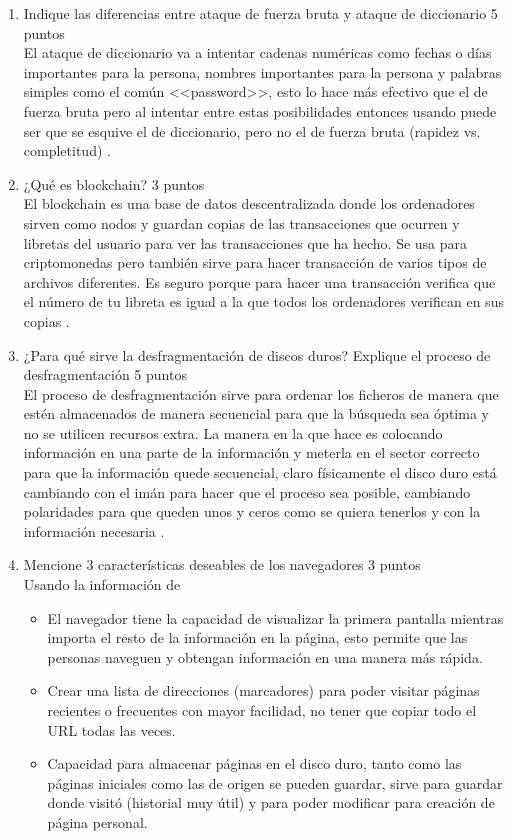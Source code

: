 \documentclass[stu, 12pt, letterpaper, donotrepeattitle, floatsintext, natbib, helv]{apa7}
\begin{document}
\begin{enumerate}
    \item Indique las diferencias entre ataque de fuerza bruta y ataque de diccionario 5 puntos \\
    El ataque de diccionario va a intentar cadenas numéricas como fechas o días importantes para la persona, nombres importantes para la persona y palabras simples como el común <<password>>, esto lo hace más efectivo que el de fuerza bruta pero al intentar entre estas posibilidades entonces usando puede ser que se esquive el de diccionario, pero no el de fuerza bruta (rapidez vs. completitud) .
    
    \item ¿Qué es blockchain? 3 puntos \\
    El blockchain es una base de datos descentralizada donde los ordenadores sirven como nodos y guardan copias de las transacciones que ocurren y libretas del usuario para ver las transacciones que ha hecho. Se usa para criptomonedas pero también sirve para hacer transacción de varios tipos de archivos diferentes. Es seguro porque para hacer una transacción verifica que el número de tu libreta es igual a la que todos los ordenadores verifican en sus copias .
    
    \item ¿Para qué sirve la desfragmentación de discos duros? Explique el proceso de desfragmentación 5 puntos \\
    El proceso de desfragmentación sirve para ordenar los ficheros de manera que estén almacenados de manera secuencial para que la búsqueda sea óptima y no se utilicen recursos extra. La manera en la que hace es colocando información en una parte de la información y meterla en el sector correcto para que la información quede secuencial, claro físicamente el disco duro está cambiando con el imán para hacer que el proceso sea posible, cambiando polaridades para que queden unos y ceros como se quiera tenerlos y con la información necesaria .

    \item Mencione 3 características deseables de los navegadores 3 puntos \\
    Usando la información de 
    \begin{itemize}
        \item El navegador tiene la capacidad de visualizar la primera pantalla mientras importa el resto de la información en la página, esto permite que las personas naveguen y obtengan información en una manera más rápida.
        \item Crear una lista de direcciones (marcadores) para poder visitar páginas recientes o frecuentes con mayor facilidad, no tener que copiar todo el URL todas las veces.
        \item Capacidad para almacenar páginas en el disco duro, tanto como las páginas iniciales como las de origen se pueden guardar, sirve para guardar donde visitó (historial muy útil) y para poder modificar para creación de página personal. 
    \end{itemize} 
    

\end{enumerate}
\end{document}
